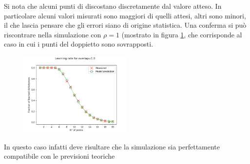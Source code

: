 \documentclass[a4paper,12pt,twoside,openright]{report}
\begin{document}
Si nota che alcuni punti di discostano discretamente dal valore atteso. In particolare alcuni valori misurati sono maggiori di quelli attesi, altri sono minori, il che lascia pensare che gli errori siano di origine statistica.
Una conferma si può riscontrare nella simulazione con $ \rho = 1 $ (mostrato in figura \ref{fig:oneshotn5rhomono=1}, che corrisponde al caso in cui i punti del doppietto sono sovrapposti.
\begin{figure}[ht]
	\centering
	\includegraphics[width=0.5\textwidth]{immriassunto/oneshotn5rhomono/1,0}
	\caption{}
	\label{fig:oneshotn5rhomono=1}
\end{figure}
In questo caso infatti deve risultare che la simulazione sia perfettamente compatibile con le previsioni teoriche
\end{document}
